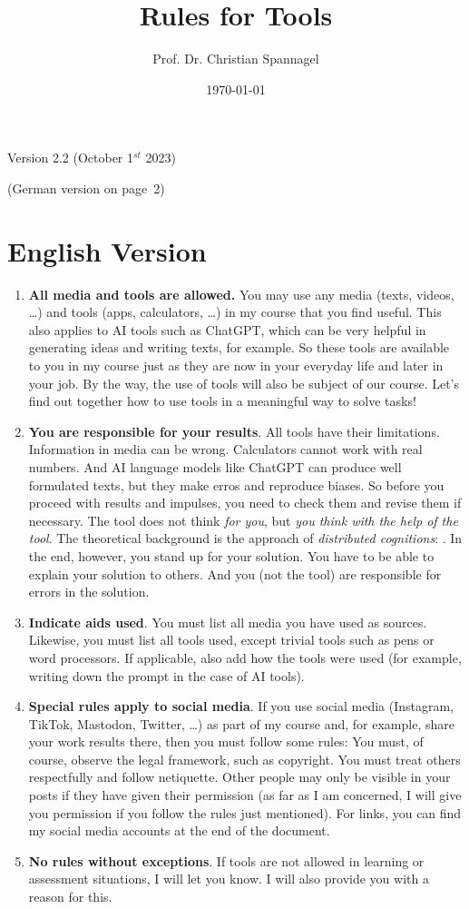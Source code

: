 \documentclass{../cssheet}
\title{Rules for Tools}
\author{Prof. Dr. Christian Spannagel}
\date{\today}
\begin{document}
\printtitle
\begin{center}
Version 2.2 (October 1$^{st}$ 2023)
\end{center}
(German version on page~2)
\section {English Version}
\begin{enumerate}
\item \textbf{All media and tools are allowed.} You may use any media (texts, videos, \ldots) and tools (apps, calculators, \ldots) in my course that you find useful. This also applies to AI tools such as ChatGPT, which can be very helpful in generating ideas and writing texts, for example. So these tools are available to you in my course just as they are now in your everyday life and later in your job. By the way, the use of tools will also be subject of our course. Let's find out together how to use tools in a meaningful way to solve tasks! 
\item \textbf{You are responsible for your results}. All tools have their limitations. Information in media can be wrong. Calculators cannot work with real numbers. And AI language models like ChatGPT can produce well formulated texts, but they make erros and reproduce biases. So before you proceed with results and impulses, you need to check them and revise them if necessary. The tool does not think \emph{for you}, but \emph{you think with the help of the tool}. The theoretical background is the approach of \emph{distributed cognitions}: . In the end, however, you stand up for your solution. You have to be able to explain your solution to others. And you (not the tool) are responsible for errors in the solution. 
\item \textbf{Indicate aids used}. You must list all media you have used as sources. Likewise, you must list all tools used, except trivial tools such as pens or word processors. If applicable, also add how the tools were used (for example, writing down the prompt in the case of AI tools).
\item \textbf{Special rules apply to social media}. If you use social media (Instagram, TikTok, Mastodon, Twitter, \ldots) as part of my course and, for example, share your work results there, then you must follow some rules: You must, of course, observe the legal framework, such as copyright. You must treat others respectfully and follow netiquette. Other people may only be visible in your posts if they have given their permission (as far as I am concerned, I will give you permission if you follow the rules just mentioned). For links, you can find my social media accounts at the end of the document.
\item \textbf{No rules without exceptions}. If tools are not allowed in learning or assessment situations, I will let you know. I will also provide you with a reason for this.
\end{enumerate}
\end{document}
